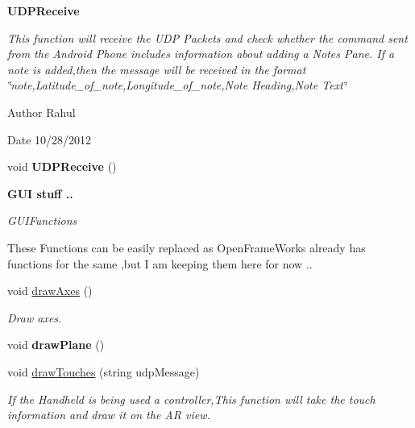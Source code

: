 \begin{Indent}{\bf U\-D\-P\-Receive}\par
{\em This function will receive the U\-D\-P Packets and check whether the command sent from the Android Phone includes information about adding a Notes Pane. If a note is added,then the message will be received in the format \char`\"{}note,\-Latitude\-\_\-of\-\_\-note,\-Longitude\-\_\-of\-\_\-note,\-Note Heading,\-Note Text\char`\"{}

\begin{DoxyAuthor}{Author}
Rahul 
\end{DoxyAuthor}
\begin{DoxyDate}{Date}
10/28/2012 
\end{DoxyDate}
}\begin{DoxyCompactItemize}
\item 
\hypertarget{classtest_app_ae18e12d5025a2167ebd63ca019468cc0}{void {\bfseries U\-D\-P\-Receive} ()}\label{classtest_app_ae18e12d5025a2167ebd63ca019468cc0}

\end{DoxyCompactItemize}
\end{Indent}
\begin{Indent}{\bf G\-U\-I stuff ..}\par
{\em G\-U\-I\-Functions

These Functions can be easily replaced as Open\-Frame\-Works already has functions for the same ,but I am keeping them here for now .. }\begin{DoxyCompactItemize}
\item 
void \hyperlink{classtest_app_aa2fcbae31171ba366d4c0fcaf44149f4}{draw\-Axes} ()
\begin{DoxyCompactList}\small\item\em Draw axes. \end{DoxyCompactList}\item 
\hypertarget{classtest_app_a47747729f6d0d84c36ef0ec9fca01303}{void {\bfseries draw\-Plane} ()}\label{classtest_app_a47747729f6d0d84c36ef0ec9fca01303}

\item 
void \hyperlink{classtest_app_a16036c3aa23c1747e315a3e18105cf45}{draw\-Touches} (string udp\-Message)
\begin{DoxyCompactList}\small\item\em If the Handheld is being used a controller,This function will take the touch information and draw it on the A\-R view. \end{DoxyCompactList}\end{DoxyCompactItemize}
\end{Indent}
